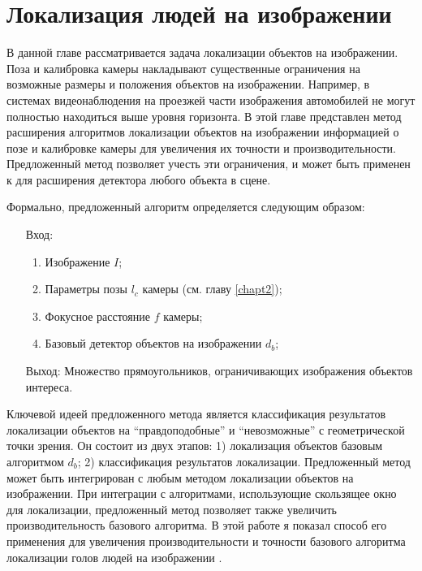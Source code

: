 
\chapter{Локализация людей на изображении} \label{chapt3}

В данной главе рассматривается задача локализации объектов на изображении. Поза и калибровка камеры накладывают существенные ограничения на возможные размеры и положения объектов на изображении. Например, в системах видеонаблюдения на проезжей части изображения автомобилей не могут полностью находиться выше уровня горизонта. В этой главе представлен метод расширения алгоритмов локализации объектов на изображении информацией о позе и калибровке камеры для увеличения их точности и производительности. Предложенный метод позволяет учесть эти ограничения, и может быть применен к для расширения детектора любого объекта в сцене.

Формально, предложенный алгоритм определяется следующим образом:
\begin{itemize}
	\item[Вход:]
	\begin{enumerate}
		\item Изображение $I$;
		\item Параметры позы $l_c$ камеры (см. главу \ref{chapt2});
		\item Фокусное расстояние $f$ камеры;
		\item Базовый детектор объектов на изображении $d_b$;
	\end{enumerate}
	\item[Выход:] Множество прямоугольников, ограничивающих изображения объектов интереса.
\end{itemize}

Ключевой идеей предложенного метода является классификация результатов локализации объектов на ``правдоподобные'' и ``невозможные'' с геометрической точки зрения. Он состоит из двух этапов: 1) локализация объектов базовым алгоритмом $d_b$; 2) классификация результатов локализации. Предложенный метод может быть интегрирован с любым методом локализации объектов на изображении. При интеграции с алгоритмами, использующие скользящее окно для локализации, предложенный метод позволяет также увеличить производительность базового алгоритма. В этой работе я показал способ его применения для увеличения производительности и точности базового алгоритма локализации голов людей на изображении \cite{prisacariu_reid_tr2310_09}.

